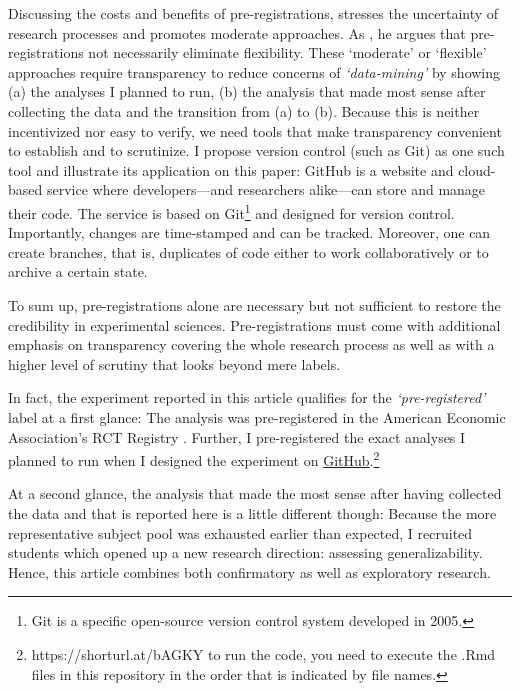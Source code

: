 \documentclass[
  authoryear,
  review,
  3p,
  onecolumn]{elsarticle}
\begin{document}
Discussing the costs and benefits of pre-registrations,
\citet{Olken2015} stresses the uncertainty of research processes and
promotes moderate approaches. As \citet{WaldronAllen2022}, he argues
that pre-registrations not necessarily eliminate flexibility. These
`moderate' or `flexible' approaches require transparency to reduce
concerns of \emph{`data-mining'} \citep[ p.~61]{Olken2015} by showing
(a) the analyses I planned to run, (b) the analysis that made most sense
after collecting the data and the transition from (a) to (b). Because
this is neither incentivized nor easy to verify, we need tools that make
transparency convenient to establish and to scrutinize. I propose
version control (such as Git) as one such tool and illustrate its
application on this paper: GitHub is a website and cloud-based service
where developers---and researchers alike---can store and manage their
code. The service is based on Git\footnote{Git is a specific open-source
  version control system developed in 2005.} and designed for version
control. Importantly, changes are time-stamped and can be tracked.
Moreover, one can create branches, that is, duplicates of code either to
work collaboratively or to archive a certain state.

To sum up, pre-registrations alone are necessary but not sufficient to
restore the credibility in experimental sciences. Pre-registrations must
come with additional emphasis on transparency covering the whole
research process as well as with a higher level of scrutiny that looks
beyond mere labels.

In fact, the experiment reported in this article qualifies for the
\emph{`pre-registered'} label at a first glance: The analysis was
pre-registered in the American Economic Association's RCT Registry
\citep{preregistration}. Further, I pre-registered the exact analyses I
planned to run when I designed the experiment on
\href{https://shorturl.at/bAGKY}{GitHub}.\footnote{https://shorturl.at/bAGKY
  to run the code, you need to execute the .Rmd files in this repository
  in the order that is indicated by file names.}

At a second glance, the analysis that made the most sense after having
collected the data and that is reported here is a little different
though: Because the more representative subject pool was exhausted
earlier than expected, I recruited students which opened up a new
research direction: assessing generalizability. Hence, this article
combines both confirmatory as well as exploratory research.
\end{document}
